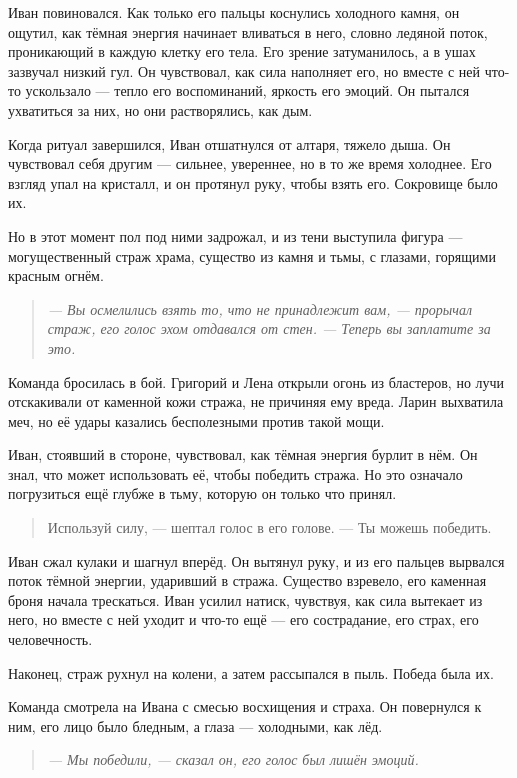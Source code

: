 \documentclass[12pt,a4paper]{book}
\newenvironment{dialogue}{\begin{quote}\itshape}{\end{quote}} %
\begin{document}
Иван повиновался. Как только его пальцы коснулись холодного камня, он ощутил, как тёмная энергия начинает вливаться в него, словно ледяной поток, проникающий в каждую клетку его тела. Его зрение затуманилось, а в ушах зазвучал низкий гул. Он чувствовал, как сила наполняет его, но вместе с ней что-то ускользало --- тепло его воспоминаний, яркость его эмоций. Он пытался ухватиться за них, но они растворялись, как дым.

Когда ритуал завершился, Иван отшатнулся от алтаря, тяжело дыша. Он чувствовал себя другим --- сильнее, увереннее, но в то же время холоднее. Его взгляд упал на кристалл, и он протянул руку, чтобы взять его. Сокровище было их.

Но в этот момент пол под ними задрожал, и из тени выступила фигура --- могущественный страж храма, существо из камня и тьмы, с глазами, горящими красным огнём.

\begin{dialogue}
--- Вы осмелились взять то, что не принадлежит вам, --- прорычал страж, его голос эхом отдавался от стен. --- Теперь вы заплатите за это.
\end{dialogue}

Команда бросилась в бой. Григорий и Лена открыли огонь из бластеров, но лучи отскакивали от каменной кожи стража, не причиняя ему вреда. Ларин выхватила меч, но её удары казались бесполезными против такой мощи.

Иван, стоявший в стороне, чувствовал, как тёмная энергия бурлит в нём. Он знал, что может использовать её, чтобы победить стража. Но это означало погрузиться ещё глубже в тьму, которую он только что принял.

\begin{quote}
Используй силу, --- шептал голос в его голове. --- Ты можешь победить.
\end{quote}

Иван сжал кулаки и шагнул вперёд. Он вытянул руку, и из его пальцев вырвался поток тёмной энергии, ударивший в стража. Существо взревело, его каменная броня начала трескаться. Иван усилил натиск, чувствуя, как сила вытекает из него, но вместе с ней уходит и что-то ещё --- его сострадание, его страх, его человечность.

Наконец, страж рухнул на колени, а затем рассыпался в пыль. Победа была их.

Команда смотрела на Ивана с смесью восхищения и страха. Он повернулся к ним, его лицо было бледным, а глаза --- холодными, как лёд.

\begin{dialogue}
--- Мы победили, --- сказал он, его голос был лишён эмоций.
\end{dialogue}
\end{document}
